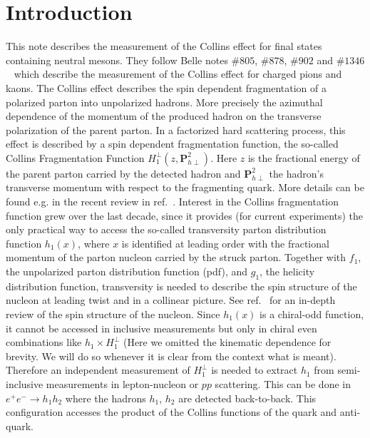 \section{Introduction}

This note describes the measurement of the Collins effect for final states containing neutral mesons. They follow Belle notes $\#805$, $\#878$, $\#902$ and $\#1346$~\cite{BelleNote1,BelleNote2,BelleNote3,BelleNote4} which describe the measurement of the Collins effect for charged pions and kaons. 
The Collins effect describes the spin dependent fragmentation of a polarized parton into unpolarized hadrons. More precisely the azimuthal dependence of the momentum of the produced hadron on the transverse polarization of the parent parton. 
In a factorized hard scattering process, this effect is described by a spin dependent fragmentation function, the so-called Collins Fragmentation Function $H^{\perp}_1(z,\boldsymbol{P}^2_{h\perp})$. Here $z$ is the fractional energy of the parent parton carried by the detected hadron and $\boldsymbol{P}^2_{h\perp}$ the hadron's transverse momentum with respect to the fragmenting quark. More details can be found e.g. in the recent review in ref.~\cite{Metz:2016swz}. Interest in the Collins fragmentation function grew over the last decade, since it provides (for current experiments) the only practical way to access the so-called transversity parton distribution function $h_1(x)$, where $x$ is identified at leading order with the fractional momentum of the parton nucleon carried by the struck parton.  Together with $f_1$, the unpolarized parton distribution function (pdf), and $g_1$, the helicity distribution function,  transversity is needed to describe the spin structure of the nucleon at leading twist and in a collinear picture. See ref.~\cite{Aidala:2012mv} for an in-depth review of the spin structure of the nucleon. 
Since $h_1(x)$ is a chiral-odd function, it cannot be accessed in inclusive measurements but only in chiral even combinations like $h_1 \times H^\perp_1$ (Here we omitted the kinematic dependence for brevity. We will do so whenever it is clear from the context what is meant). Therefore an independent measurement of $H^\perp_1$ is needed to extract $h_1$ from semi-inclusive measurements in lepton-nucleon or $pp$ scattering. This can be done in $e^+e^-\rightarrow h_1 h_2$ where the hadrons $h_1$, $h_2$ are detected back-to-back. This configuration accesses the product of the Collins functions of the quark and anti-quark. 

